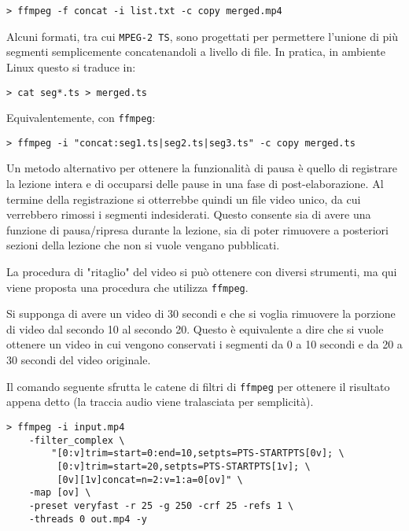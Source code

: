 \begin{verbatim}
> ffmpeg -f concat -i list.txt -c copy merged.mp4
\end{verbatim}

Alcuni formati, tra cui \texttt{MPEG-2 TS}, sono progettati per permettere l'unione di più segmenti semplicemente concatenandoli a livello di file. In pratica, in ambiente Linux questo si traduce in:

\begin{verbatim}
> cat seg*.ts > merged.ts
\end{verbatim}

Equivalentemente, con \texttt{ffmpeg}:

\begin{verbatim}
> ffmpeg -i "concat:seg1.ts|seg2.ts|seg3.ts" -c copy merged.ts
\end{verbatim}

Un metodo alternativo per ottenere la funzionalità di pausa è quello di registrare la lezione intera e di occuparsi delle pause in una fase di post-elaborazione. Al termine della registrazione si otterrebbe quindi un file video unico, da cui verrebbero rimossi i segmenti indesiderati. Questo consente sia di avere una funzione di pausa/ripresa durante la lezione, sia di poter rimuovere a posteriori sezioni della lezione che non si vuole vengano pubblicati.

La procedura di "ritaglio" del video si può ottenere con diversi strumenti, ma qui viene proposta una procedura che utilizza \texttt{ffmpeg}.

Si supponga di avere un video di 30 secondi e che si voglia rimuovere la porzione di video dal secondo 10 al secondo 20. Questo è equivalente a dire che si vuole ottenere un video in cui vengono conservati i segmenti da 0 a 10 secondi e da 20 a 30 secondi del video originale.

Il comando seguente sfrutta le catene di filtri di \texttt{ffmpeg} per ottenere il risultato appena detto (la traccia audio viene tralasciata per semplicità).

\begin{verbatim}
> ffmpeg -i input.mp4 
    -filter_complex \
        "[0:v]trim=start=0:end=10,setpts=PTS-STARTPTS[0v]; \
         [0:v]trim=start=20,setpts=PTS-STARTPTS[1v]; \
         [0v][1v]concat=n=2:v=1:a=0[ov]" \
    -map [ov] \
    -preset veryfast -r 25 -g 250 -crf 25 -refs 1 \
    -threads 0 out.mp4 -y
\end{verbatim}

